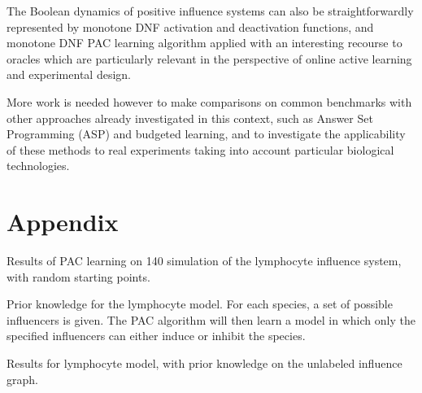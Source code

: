 \documentclass{llncs}
\begin{document}
The Boolean dynamics of positive influence systems can also be straightforwardly represented by monotone DNF activation and deactivation functions,
and monotone DNF PAC learning algorithm applied with an interesting recourse to oracles 
which are particularly relevant in the perspective of online active learning and experimental design.

More work is needed however to make comparisons on common benchmarks
with  other approaches already investigated in this context, such as Answer Set Programming (ASP) and budgeted learning,
and to investigate the applicability of these methods to real experiments taking into account particular biological technologies.



\newpage
\section*{Appendix}
\begin{listfig}[htb]
	
	\caption{Results of PAC learning on 140 simulation of the lymphocyte influence system, with random starting points.\label{lympho-rand.res}}
\end{listfig}

\begin{listfig}[htb]
	
	\caption{Prior knowledge for the lymphocyte model. For each species, a set of possible influencers is given. The PAC algorithm will then learn a model in which only the specified influencers can either induce or inhibit the species.\label{hints}}
\end{listfig}



\begin{listfig}
	
	\caption{Results for lymphocyte model, with prior knowledge on the unlabeled influence graph.\label{hints.res}}
\end{listfig}
\end{document}
